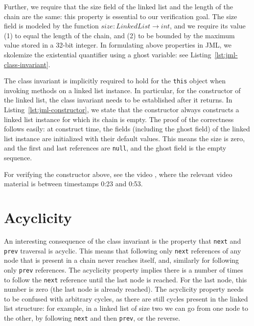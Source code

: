 \documentclass[runningheads]{llncs}
\begin{document}
Further, we require that the size field of the linked list and the length of the chain are the same: this property is essential to our verification goal. The size field is modeled by the function $\mathit{size}: \mathit{LinkedList}\to \mathit{int}$, and we require its value (1) to equal the length of the chain, and (2) to be bounded by the maximum value stored in a 32-bit integer. In formulating above properties in JML, we skolemize the existential quantifier using a ghost variable: see Listing~\ref{lst:jml-class-invariant}.



The class invariant is implicitly required to hold for the \texttt{this} object when invoking methods on a linked list instance. In particular, for the constructor of the linked list, the class invariant needs to be established after it returns. In Listing~\ref{lst:jml-constructor}, we state that the constructor always constructs a linked list instance for which its chain is empty. The proof of the correctness follows easily: at construct time, the fields (including the ghost field) of the linked list instance are initialized with their default values. This means the size is zero, and the first and last references are \texttt{null}, and the ghost field is the empty sequence.



For verifying the constructor above, see the video , where the relevant video material is between timestamps 0:23 and 0:53.

\section{Acyclicity}\label{sec:acyclicity}

An interesting consequence of the class invariant is the property that \texttt{next} and \texttt{prev} traversal is acyclic. This means that following only \texttt{next} references of any node that is present in a chain never reaches itself, and, similarly for following only \texttt{prev} references.  The acyclicity property implies there is a number of times to follow the \texttt{next} reference until the last node is reached. For the last node, this number is zero (the last node is already reached). The acyclicity property needs to be confused with arbitrary cycles, as there are still cycles present in the linked list structure: for example, in a linked list of size two we can go from one node to the other, by following \texttt{next} and then \texttt{prev}, or the reverse.
\end{document}
